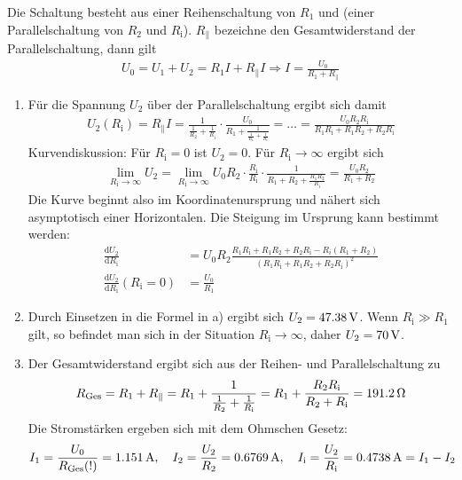 \documentclass[a4paper]{scrartcl}
\begin{document}
Die Schaltung besteht aus einer Reihenschaltung von $R_1$ und (einer Parallelschaltung von $R_2$ und $R_\text{i}$). $R_\parallel$ bezeichne den Gesamtwiderstand der Parallelschaltung, dann gilt
\begin{align*}
  U_0 = U_1 + U_2 = R_1I + R_\parallel I \Rightarrow I = \frac{U_0}{R_1 + R_\parallel}
\end{align*}
\begin{enumerate}[noitemsep]
  \item 
Für die Spannung $U_2$ über der Parallelschaltung ergibt sich damit
\begin{align*}
  U_2(R_\text{i}) = R_\parallel I = \frac{1}{\frac{1}{R_2} + \frac{1}{R_\text{i}}} \cdot \frac{U_0}{R_1 + \frac{1}{\frac{1}{R_1} + \frac{1}{R_\text{i}}}} = \dots = \frac{U_0 R_2 R_\text{i}}{R_1R_\text{i} + R_1R_2 + R_2R_\text{i}}
\end{align*}
Kurvendiskussion: Für $R_\text{i} = 0$ ist $U_2 = 0$. Für $R_\text{i} \to \infty$ ergibt sich
\begin{align*}
  \lim_{R_\text{i} \to \infty}U_2 = \lim_{R_\text{i}\to\infty} U_0R_2 \cdot \frac{R_\text{i}}{R_\text{i}}\cdot\frac{1}{R_1+R_2+\frac{R_1R_2}{R_\text{i}}} = \frac{U_0R_2}{R_1+R_2}
\end{align*}
Die Kurve beginnt also im Koordinatenursprung und nähert sich asymptotisch einer Horizontalen. Die Steigung im Ursprung kann bestimmt werden:
\begin{align*}
  \frac{\text{d}U_2}{\text{d}R_\text{i}} &= U_0R_2 \frac{R_1R_\text{i} + R_1R_2 + R_2R_\text{i} - R_i(R_1 + R_2)}{(R_1R_\text{i} + R_1R_2 + R_2R_\text{i})^2}\\
  \frac{\text{d}U_2}{\text{d}R_\text{i}}(R_\text{i}=0) &= \frac{U_0}{R_1}
\end{align*}
\item Durch Einsetzen in die Formel in a) ergibt sich $U_2 = \unit[47.38]{V}$. Wenn $R_\text{i} \gg R_1$ gilt, so befindet man sich in der Situation $R_\text{i} \to\infty$, daher $U_2 = \unit[70]{V}$.
\item Der Gesamtwiderstand ergibt sich aus der Reihen- und Parallelschaltung zu
  \begin{align*}
    R_\text{Ges} = R_1 + R_\parallel = R_1 + \frac{1}{\frac{1}{R_2} + \frac{1}{R_\text{i}}} = R_1 + \frac{R_2R_\text{i}}{R_2 + R_\text{i}} = \unit[191.2]{\Omega}
  \end{align*}
  Die Stromstärken ergeben sich mit dem Ohmschen Gesetz:
  \begin{align*}
    I_1 = \frac{U_0}{R_\text{Ges}(!)} = \unit[1.151]{A}, \quad I_2 = \frac{U_2}{R_2} = \unit[0.6769]{A}, \quad I_\text{i}=\frac{U_2}{R_\text{i}} = \unit[0.4738]{A} = I_1 - I_2

\end{align*}
\end{enumerate}
\end{document}
